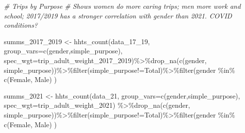 \documentclass[
  12pt,
]{article}
\newenvironment{Shaded}{\begin{snugshade}}{\end{snugshade}}
\newcommand{\AttributeTok}[1]{\textcolor[rgb]{0.77,0.63,0.00}{#1}}
\newcommand{\CommentTok}[1]{\textcolor[rgb]{0.56,0.35,0.01}{\textit{#1}}}
\newcommand{\FunctionTok}[1]{\textcolor[rgb]{0.00,0.00,0.00}{#1}}
\newcommand{\NormalTok}[1]{#1}
\newcommand{\OtherTok}[1]{\textcolor[rgb]{0.56,0.35,0.01}{#1}}
\newcommand{\SpecialCharTok}[1]{\textcolor[rgb]{0.00,0.00,0.00}{#1}}
\newcommand{\StringTok}[1]{\textcolor[rgb]{0.31,0.60,0.02}{#1}}
\begin{document}
\begin{Shaded}
\begin{Highlighting}[]
\CommentTok{\# Trips by Purpose}
\CommentTok{\# Shows women do more caring trips; men more work and school; 2017/2019 has a stronger correlation with gender than 2021. COVID conditions?}

\NormalTok{  summs\_2017\_2019 }\OtherTok{\textless{}{-}} \FunctionTok{hhts\_count}\NormalTok{(data\_17\_19,}
                                        \AttributeTok{group\_vars=}\FunctionTok{c}\NormalTok{(}\StringTok{\textquotesingle{}gender\textquotesingle{}}\NormalTok{,}\StringTok{\textquotesingle{}simple\_purpose\textquotesingle{}}\NormalTok{),}
                                        \AttributeTok{spec\_wgt=}\StringTok{\textquotesingle{}trip\_adult\_weight\_2017\_2019\textquotesingle{}}\NormalTok{)}\SpecialCharTok{\%\textgreater{}\%}\FunctionTok{drop\_na}\NormalTok{(}\FunctionTok{c}\NormalTok{(}\StringTok{\textquotesingle{}gender\textquotesingle{}}\NormalTok{, }\StringTok{\textquotesingle{}simple\_purpose\textquotesingle{}}\NormalTok{))}\SpecialCharTok{\%\textgreater{}\%}\FunctionTok{filter}\NormalTok{(simple\_purpose}\SpecialCharTok{!=}\StringTok{\textquotesingle{}Total\textquotesingle{}}\NormalTok{)}\SpecialCharTok{\%\textgreater{}\%}\FunctionTok{filter}\NormalTok{(gender }\SpecialCharTok{\%in\%} \FunctionTok{c}\NormalTok{(}\StringTok{\textquotesingle{}Female\textquotesingle{}}\NormalTok{, }\StringTok{\textquotesingle{}Male\textquotesingle{}}\NormalTok{) )}

\NormalTok{  summs\_2021 }\OtherTok{\textless{}{-}} \FunctionTok{hhts\_count}\NormalTok{(data\_21,}
                                   \AttributeTok{group\_vars=}\FunctionTok{c}\NormalTok{(}\StringTok{\textquotesingle{}gender\textquotesingle{}}\NormalTok{,}\StringTok{\textquotesingle{}simple\_purpose\textquotesingle{}}\NormalTok{),}
                                   \AttributeTok{spec\_wgt=}\StringTok{\textquotesingle{}trip\_adult\_weight\_2021\textquotesingle{}}\NormalTok{) }\SpecialCharTok{\%\textgreater{}\%}\FunctionTok{drop\_na}\NormalTok{(}\FunctionTok{c}\NormalTok{(}\StringTok{\textquotesingle{}gender\textquotesingle{}}\NormalTok{, }\StringTok{\textquotesingle{}simple\_purpose\textquotesingle{}}\NormalTok{))}\SpecialCharTok{\%\textgreater{}\%}\FunctionTok{filter}\NormalTok{(simple\_purpose}\SpecialCharTok{!=}\StringTok{\textquotesingle{}Total\textquotesingle{}}\NormalTok{)}\SpecialCharTok{\%\textgreater{}\%}\FunctionTok{filter}\NormalTok{(gender }\SpecialCharTok{\%in\%} \FunctionTok{c}\NormalTok{(}\StringTok{\textquotesingle{}Female\textquotesingle{}}\NormalTok{, }\StringTok{\textquotesingle{}Male\textquotesingle{}}\NormalTok{) )}
  

\end{Highlighting}
\end{Shaded}
\end{document}
